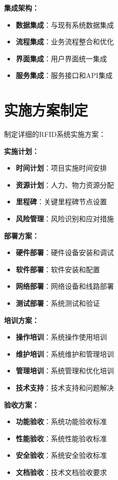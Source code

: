 \documentclass[12pt,UTF8]{ctexbook}
\begin{document}
\begin{itemize}[leftmargin=3.5em]
\begin{itemize}[leftmargin=3.5em]
\begin{itemize}[leftmargin=3.5em]
\begin{itemize}[leftmargin=3.5em]
\textbf{集成架构：}
\begin{itemize}[leftmargin=3.5em]
    \item \textbf{数据集成}：与现有系统数据集成
    \item \textbf{流程集成}：业务流程整合和优化
    \item \textbf{界面集成}：用户界面统一集成
    \item \textbf{服务集成}：服务接口和API集成
\end{itemize}

\section{实施方案制定}

制定详细的RFID系统实施方案：

\textbf{实施计划：}
\begin{itemize}[leftmargin=3.5em]
    \item \textbf{时间计划}：项目实施时间安排
    \item \textbf{资源计划}：人力、物力资源分配
    \item \textbf{里程碑}：关键里程碑节点设置
    \item \textbf{风险管理}：风险识别和应对措施
\end{itemize}

\textbf{部署方案：}
\begin{itemize}[leftmargin=3.5em]
    \item \textbf{硬件部署}：硬件设备安装和调试
    \item \textbf{软件部署}：软件安装和配置
    \item \textbf{网络部署}：网络设备和线路部署
    \item \textbf{测试部署}：系统测试和验证
\end{itemize}

\textbf{培训方案：}
\begin{itemize}[leftmargin=3.5em]
    \item \textbf{操作培训}：系统操作使用培训
    \item \textbf{维护培训}：系统维护和管理培训
    \item \textbf{管理培训}：系统管理和优化培训
    \item \textbf{技术支持}：技术支持和问题解决
\end{itemize}

\textbf{验收方案：}
\begin{itemize}[leftmargin=3.5em]
    \item \textbf{功能验收}：系统功能验收标准
    \item \textbf{性能验收}：系统性能验收标准
    \item \textbf{安全验收}：系统安全验收标准
    \item \textbf{文档验收}：技术文档验收要求
\end{itemize}


\end{itemize}
\end{itemize}
\end{itemize}
\end{itemize}
\end{document}
